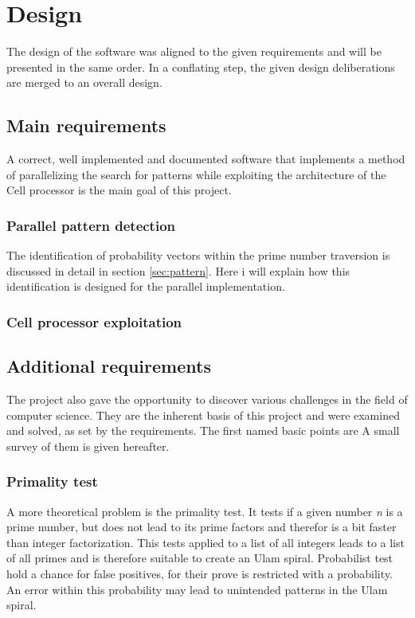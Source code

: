 \section{Design}
\label{sec:design}
The design of the software was aligned to the given requirements and will be presented in the same order. In a conflating step, the given design deliberations are merged to an overall design.

\subsection{Main requirements}
\label{sec:main_req}
A correct, well implemented and documented software that implements a method of parallelizing the search for patterns while exploiting the architecture of the Cell processor is the main goal of this project.

\subsubsection{Parallel pattern detection}
\label{sec:parallel_search}
The identification of probability vectors within the prime number traversion is discussed in detail in section \ref{sec:pattern}. Here i will explain how this identification is designed for the parallel implementation.

\subsubsection{Cell processor exploitation}
\label{sec:cell_exploit}

\cite{cellguide}




\subsection{Additional requirements}
\label{sec:additional_req}
The project also gave the opportunity to discover various challenges in the field of computer science. They are the inherent basis of this project and were examined and solved, as set by the requirements. The first named basic points are A small survey of them is given hereafter.

\subsubsection{Primality test}
\label{sec:primality_test}
A more theoretical problem is the primality test. It tests if a given number \emph{n} is a prime number, but does not lead to its prime factors and therefor is a bit faster than integer factorization. This tests applied to a list of all integers leads to a list of all primes and is therefore suitable to create an Ulam spiral. Probabilist test hold a chance for false positives, for their prove is restricted with a probability. An error within this probability may lead to unintended patterns in the Ulam spiral.

